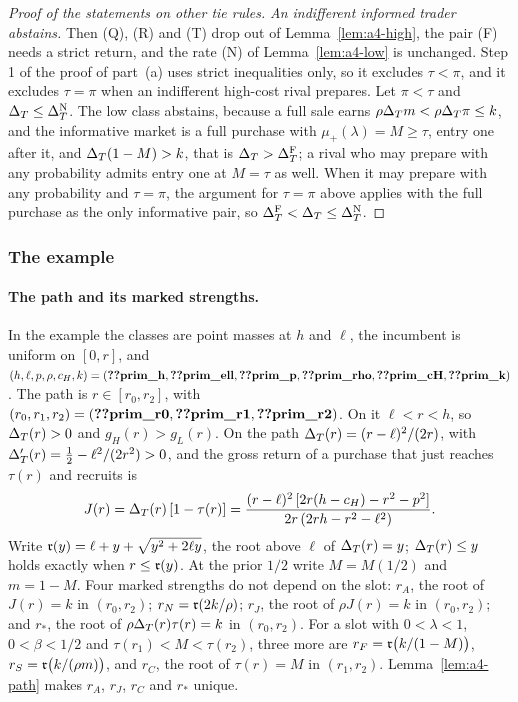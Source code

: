\begin{proof}[Proof of the statements on other tie rules]
\emph{An indifferent informed trader abstains.} Then (Q), (R) and (T) drop out of Lemma~\ref{lem:a4-high}, the pair (F)
needs a strict return, and the rate (N) of Lemma~\ref{lem:a4-low} is unchanged. Step 1 of the proof of part~(a) uses
strict inequalities only, so it excludes \(\tau<\pi\), and it excludes \(\tau=\pi\) when an indifferent high-cost
rival prepares. Let \(\pi<\tau\) and \(\Delta_T\le\Delta_T^{\rm N}\). The low class abstains, because a full sale earns
\(\rho\Delta_T m<\rho\Delta_T\pi\le k\), and the informative market is a full purchase with \(\mu_+(\lambda)=M\ge\tau\), entry
one after it, and \(\Delta_T(1-M)>k\), that is \(\Delta_T>\Delta_T^{\rm F}\); a rival who may prepare with any probability admits
entry one at \(M=\tau\) as well. When it may prepare with any probability and \(\tau=\pi\), the argument for
\(\tau=\pi\) above applies with the full purchase as the only informative pair, so \(\Delta_T^{\rm F}<\Delta_T\le\Delta_T^{\rm N}\).
\end{proof}

\subsubsection*{The example}

\paragraph{The path and its marked strengths.}
In the example the classes are point masses at \(h\) and \(\ell\), the incumbent is uniform on \([0,r]\), and
\((h,\ell,p,\rho,c_H,k)=(\reg{prim_h},\reg{prim_ell},\reg{prim_p},\reg{prim_rho},\reg{prim_cH},\reg{prim_k})\). The path
is \(r\in[r_0,r_2]\), with \((r_0,r_1,r_2)=(\reg{prim_r0},\reg{prim_r1},\reg{prim_r2})\). On it \(\ell<r<h\), so
\(\Delta_T(r)>0\) and \(g_H(r)>g_L(r)\). On the path \(\Delta_T(r)=(r-\ell)^2/(2r)\), with \(\Delta_T'(r)=\tfrac12-\ell^2/(2r^2)>0\), and
the gross return of a purchase that just reaches \(\tau(r)\) and recruits is
\[
J(r)=\Delta_T(r)\,[1-\tau(r)]=\frac{(r-\ell)^2\,[2r(h-c_H)-r^2-p^2]}{2r\,(2rh-r^2-\ell^2)} .
\]
Write \(\mathfrak{r}(y)=\ell+y+\sqrt{y^2+2\ell y}\), the root above \(\ell\) of \(\Delta_T(r)=y\);
\(\Delta_T(r)\le y\) holds exactly when \(r\le\mathfrak{r}(y)\). At the prior \(1/2\) write \(M=M(1/2)\) and \(m=1-M\). Four marked
strengths do not depend on the slot: \(r_A\), the root of \(J(r)=k\) in \((r_0,r_2)\); \(r_N=\mathfrak{r}(2k/\rho)\); \(r_J\),
the root of \(\rho J(r)=k\) in \((r_0,r_2)\); and \(r_*\), the root of \(\rho\Delta_T(r)\tau(r)=k\) in \((r_0,r_2)\). For a
slot with \(0<\lambda<1\), \(0<\beta<1/2\) and \(\tau(r_1)<M<\tau(r_2)\), three more are \(r_F=\mathfrak{r}\bigl(k/(1-M)\bigr)\),
\(r_S=\mathfrak{r}\bigl(k/(\rho m)\bigr)\), and \(r_C\), the root of \(\tau(r)=M\) in \((r_1,r_2)\). Lemma~\ref{lem:a4-path} makes
\(r_A\), \(r_J\), \(r_C\) and \(r_*\) unique.

